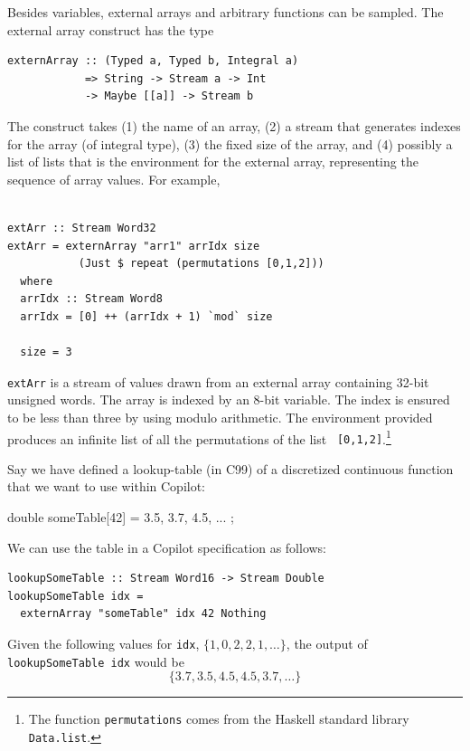 Besides variables, external arrays and arbitrary functions can be sampled.  The
external array construct has the type
%
\begin{lstlisting}[language = Copilot, frame = single]
externArray :: (Typed a, Typed b, Integral a) 
            => String -> Stream a -> Int 
            -> Maybe [[a]] -> Stream b  
\end{lstlisting}
%
The construct takes (1) the name of an array, (2) a stream that generates indexes for
the array (of integral type), (3) the fixed size of the array, and (4) possibly a list of lists that is the
environment for the external array, representing the sequence of array values.  For example,
%
\begin{lstlisting}[language = Copilot, frame = single]

extArr :: Stream Word32
extArr = externArray "arr1" arrIdx size 
           (Just $ repeat (permutations [0,1,2]))
  where 
  arrIdx :: Stream Word8
  arrIdx = [0] ++ (arrIdx + 1) `mod` size

  size = 3
\end{lstlisting} 
{\tt extArr} is a stream of values drawn from an external array containing
32-bit unsigned words.  The array is indexed by an 8-bit variable.  The index
is ensured to be less than three by using modulo arithmetic.  The environment
provided produces an infinite list of all the permutations of the list {\tt
  [0,1,2]}.\footnote{The function {\tt permutations} comes from the Haskell
    standard library {\tt Data.list}.}



%
\begin{example}
\label{exm:e}
Say we have defined a lookup-table (in C99) of a discretized continuous function that we want to use
within Copilot:
%
\begin{code}[frame = single]
double someTable[42] = { 3.5, 3.7, 4.5, ... };
\end{code}
%
We can use the table in a Copilot specification as follows:
%
\begin{lstlisting}[language = Copilot, frame = single]
lookupSomeTable :: Stream Word16 -> Stream Double
lookupSomeTable idx = 
  externArray "someTable" idx 42 Nothing
\end{lstlisting}
%
Given the following values for \texttt{idx}, $\{1, 0, 2, 2, 1, \dots \}$, the output of 
\texttt{lookupSomeTable idx} would be $$\{3.7, 3.5, 4.5, 4.5, 3.7, \dots \}$$
\end{example}

